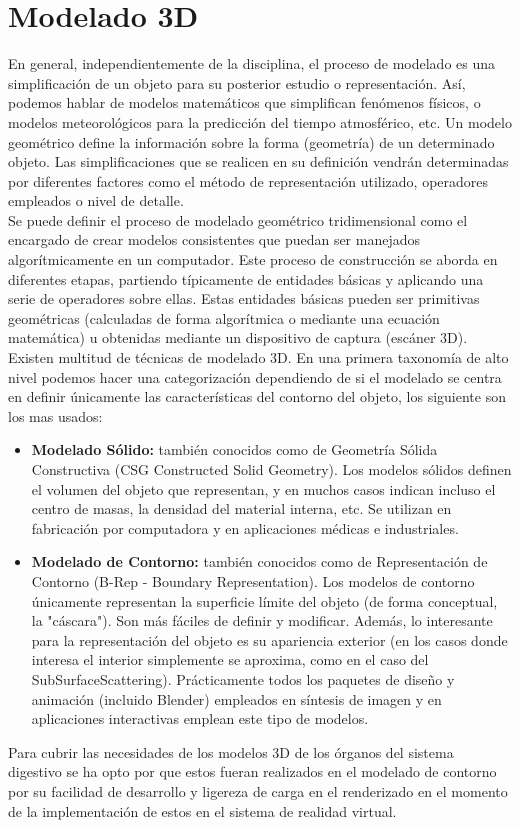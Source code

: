 \section{Modelado 3D}
En general, independientemente de la disciplina, el proceso de modelado es una simplificación de un objeto para su posterior estudio o representación. 
Así, podemos hablar de modelos matemáticos que simplifican fenómenos físicos, o modelos meteorológicos para la predicción del tiempo atmosférico, etc.
 Un modelo geométrico define la información sobre la forma (geometría) de un determinado objeto. Las simplificaciones que se realicen en su definición 
 vendrán determinadas por diferentes factores como el método de representación utilizado, operadores empleados o nivel de detalle.\cite{web13} \\
Se puede definir el proceso de modelado geométrico tridimensional como el encargado de crear modelos consistentes que puedan ser manejados algorítmicamente 
en un computador. Este proceso de construcción se aborda en diferentes etapas, partiendo típicamente de entidades básicas y aplicando una serie de operadores 
sobre ellas. Estas entidades básicas pueden ser primitivas geométricas (calculadas de forma algorítmica o mediante una ecuación matemática) u obtenidas mediante 
un dispositivo de captura (escáner 3D).\\
Existen multitud de técnicas de modelado 3D. En una primera taxonomía de alto nivel podemos hacer una categorización dependiendo de si el modelado se centra 
en definir únicamente las características del contorno del objeto, los siguiente son los mas usados:\\
\begin{itemize}
\item \textbf{Modelado Sólido:} también conocidos como de Geometría Sólida Constructiva (CSG Constructed Solid Geometry). Los modelos sólidos definen el volumen 
del objeto que representan, y en muchos casos indican incluso el centro de masas, la densidad del material interna, etc. Se utilizan en fabricación por computadora 
y en aplicaciones médicas e industriales.
\item \textbf{Modelado de Contorno:} también conocidos como de Representación de Contorno (B-Rep - Boundary Representation). Los modelos de contorno únicamente 
representan la superficie límite del objeto (de forma conceptual, la "cáscara"). Son más fáciles de definir y modificar. Además, lo interesante para la representación 
del objeto es su apariencia exterior (en los casos donde interesa el interior simplemente se aproxima, como en el caso del SubSurfaceScattering). Prácticamente todos 
los paquetes de diseño y animación (incluido Blender) empleados en síntesis de imagen y en aplicaciones interactivas emplean este tipo de modelos.
\end{itemize}
Para  cubrir las necesidades de los modelos 3D de los órganos del sistema digestivo se ha opto por que estos fueran realizados en el 
modelado de contorno por su facilidad de desarrollo y ligereza de carga en el renderizado en el momento de la implementación de estos 
en el sistema de realidad virtual.\\

